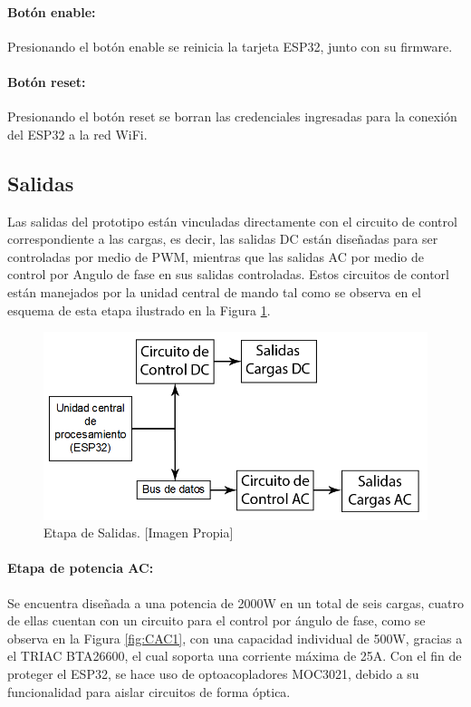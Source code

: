 	\paragraph{Botón enable:}
		Presionando el botón enable se reinicia la tarjeta ESP32, junto con su firmware.
		
	\paragraph{Botón reset:}
		Presionando el botón reset se borran las credenciales ingresadas para la conexión del ESP32 a la red WiFi.\\
		
	\subsection{Salidas}
	
	Las salidas del prototipo están vinculadas directamente con el circuito de control correspondiente a las cargas, es decir, las salidas DC están diseñadas para ser controladas por medio de PWM, mientras que las salidas AC por medio de control por Angulo de fase en sus salidas controladas. Estos circuitos de contorl están manejados por la unidad central de mando tal como se observa en el esquema de esta etapa ilustrado en la Figura \ref{fig:BSalidas}.\\ 
	
	\begin{figure}[H]
		\centering
		\caption[Etapa de Salidas.]{Etapa de Salidas. [Imagen Propia]}
		\label{fig:BSalidas}
		\includegraphics[width=0.7\linewidth]{Imagenes/B_Salidas}
	\end{figure}	
	
	\paragraph{Etapa de potencia AC:}
		Se encuentra diseñada a una potencia de 2000W en un total de seis cargas, cuatro de ellas cuentan con un circuito para el control por ángulo de fase, como se observa en la Figura \ref{fig:CAC1}, con una capacidad individual de 500W, gracias a el TRIAC BTA26600, el cual soporta una corriente máxima de 25A. Con el fin de proteger el ESP32, se hace uso de optoacopladores MOC3021, debido a su funcionalidad para aislar circuitos de forma óptica.\\
		
